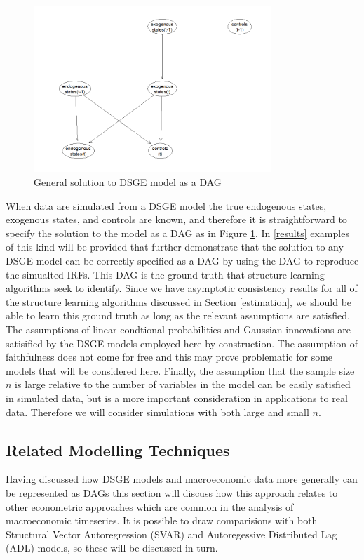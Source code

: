 \documentclass{article}
\begin{document}
\begin{figure}
  \centering
  \includegraphics[width=0.8\textwidth]{images/dsge_dag.png}
  \caption{General solution to DSGE model as a DAG}
  \label{dag11}
\end{figure}

When data are simulated from a DSGE model the true endogenous states, exogenous states, and controls are known, and therefore it is straightforward to specify the solution to the model as a DAG as in Figure \ref{dag11}. In \ref{results} examples of this kind will be provided that further demonstrate that the solution to any DSGE model can be correctly specified as a DAG by using the DAG to reproduce the simualted IRFs. This DAG is the ground truth that structure learning algorithms seek to identify. Since we have asymptotic consistency results for all of the structure learning algorithms discussed in Section \ref{estimation}, we should be able to learn this ground truth as long as the relevant assumptions are satisfied. The assumptions of linear condtional probabilities and Gaussian innovations are satisified by the DSGE models employed here by construction. The assumption of faithfulness does not come for free and this may prove problematic for some models that will be considered here. Finally, the assumption that the sample size $n$ is large relative to the number of variables in the model can be easily satisfied in simulated data, but is a more important consideration in applications to real data. Therefore we will consider simulations with both large and small $n$.

\subsection{Related Modelling Techniques}

Having discussed how DSGE models and macroeconomic data more generally can be represented as DAGs this section will discuss how this approach relates to other econometric approaches which are common in the analysis of macroeconomic timeseries. It is possible to draw comparisions with both Structural Vector Autoregression (SVAR) and Autoregessive Distributed Lag (ADL) models, so these will be discussed in turn.
\end{document}
